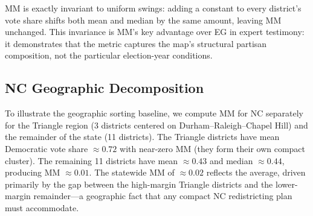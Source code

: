 MM is exactly invariant to uniform swings: adding a constant to every district's
vote share shifts both mean and median by the same amount, leaving MM unchanged.
This invariance is MM's key advantage over EG in expert testimony: it demonstrates
that the metric captures the map's structural partisan composition, not the
particular election-year conditions.

\subsection{NC Geographic Decomposition}

To illustrate the geographic sorting baseline, we compute MM for NC separately
for the Triangle region (3 districts centered on Durham--Raleigh--Chapel Hill)
and the remainder of the state (11 districts). The Triangle districts have mean
Democratic vote share $\approx 0.72$ with near-zero MM (they form their own
compact cluster). The remaining 11 districts have mean $\approx 0.43$ and median
$\approx 0.44$, producing MM $\approx 0.01$. The statewide MM of $\approx 0.02$
reflects the average, driven primarily by the gap between the high-margin Triangle
districts and the lower-margin remainder---a geographic fact that any compact
NC redistricting plan must accommodate.
